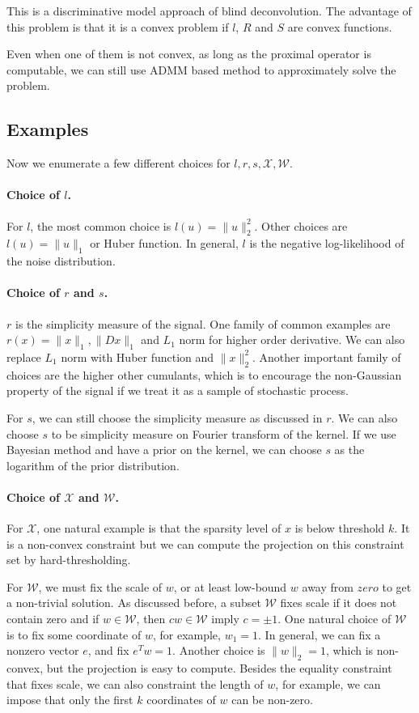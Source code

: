 \documentclass[12pt]{article}
\begin{document}
 This is a discriminative model approach of blind deconvolution. The advantage of this problem is that it is a convex problem if $l$, $R$ and $S$ are convex functions.
 
Even when one of them is not convex, as long as the proximal operator is computable, we can still use ADMM based method to approximately solve the problem.
\subsection{Examples}
Now we enumerate a few different choices for $l, r, s, \mathcal X, \mathcal W$.
\paragraph{Choice of $l$.}
For $l$, the most common choice is $l(u) = \|u\|_2^2$. Other choices are $l(u) =\|u\|_1$ or Huber function. In general, $l$ is the negative log-likelihood of the noise distribution.
\paragraph{Choice of $r$ and $s$. }
$r$ is the simplicity measure of the signal. One family of common examples are $r(x) = \|x\|_1, \|Dx\|_1$ and $L_1$ norm for higher order derivative. We can also replace $L_1$ norm with Huber function and $\|x\|_2^2$. Another important family of choices are the higher other cumulants, which is to encourage the non-Gaussian property of the signal if we treat it as a sample of stochastic process. 

For $s$, we can still choose the simplicity measure as discussed in $r$. We can also choose $s$ to be simplicity measure on Fourier transform of the kernel. If we use Bayesian method and have a prior on the kernel, we can choose $s$ as the logarithm of the prior distribution. 

\paragraph{Choice of $\mathcal X$ and $\mathcal W$. }
For $\mathcal X$, one natural example is that the sparsity level of $x$ is below threshold $k$. It is a non-convex constraint but we can compute the projection on this constraint set by hard-thresholding. 

For $\mathcal W$, we must fix the scale of $w$, or at least low-bound $w$ away from $zero$ to get a non-trivial solution.  As discussed before, a subset $\mathcal W$ fixes scale if it does not contain zero and if $w \in \mathcal W$, then $cw\in \mathcal W$ imply $c=\pm 1$.  
One natural choice of $\mathcal W$ is to fix some coordinate of $w$, for example, $w_1=1$. In general, we can fix a nonzero vector $e$, and fix $e^T w =1$. Another choice is $\|w\|_2=1$, which is non-convex, but the projection is easy to compute. Besides the equality constraint that fixes scale, we can also constraint the length of $w$, for example, we can impose that only the first $k$ coordinates of $w$ can be non-zero. 
\end{document}
